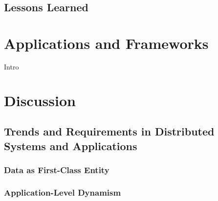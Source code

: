 \documentclass[a4paper,10pt]{article}
\begin{document}
\subsection{Lessons Learned}

\section{Applications and Frameworks}
\label{apps_and_frameworks}

Intro

\section{Discussion}

\subsection{Trends and Requirements in Distributed Systems and Applications}

\subsubsection{Data as First-Class Entity}

\subsubsection{Application-Level Dynamism}

 

\end{document}
